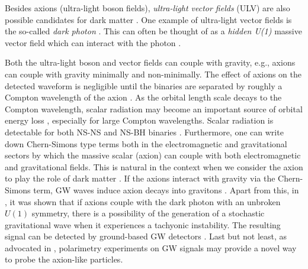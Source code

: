 Besides axions (ultra-light boson fields), \textit{ultra-light vector fields} (ULV) are also possible candidates for dark matter \cite{Cardoso:2018tly}.  One example of ultra-light vector fields is the so-called \textit{dark photon} \cite{Flambaum:2019cih}.  This can often be thought of as a \textit{hidden U(1)} massive vector field which can interact with the photon \cite{Cardoso:2018tly}.
\par
Both the ultra-light boson and vector fields can couple with gravity, e.g., axions can couple with gravity minimally and non-minimally.  The effect of axions on
the detected waveform is negligible until the binaries are separated by roughly a Compton wavelength of the axion \cite{Zhang:2019eid}. As the orbital length scale decays to the Compton wavelength, scalar radiation may become an important source
of orbital energy loss \cite{Huang:2018pbu}, especially for large Compton wavelengths.  Scalar radiation is detectable for both NS-NS and NS-BH binaries \cite{Dar:2018dra}.  Furthermore, one can write down Chern-Simons type terms both in the electromagnetic and gravitational sectors by which the massive scalar (axion) can couple with both electromagnetic and gravitational fields.  This is natural in the context when we consider the axion to play the role of dark matter \cite{Yoshida:2017cjl}.  If the axions interact with gravity via the Chern-Simons term, GW waves induce axion decays into gravitons \cite{Yoshida:2017cjl}.  Apart from this, in \cite{Machado:2018nqk, Machado:2019xuc}, it was shown that if axions couple with the dark photon with an unbroken $U(1)$ symmetry, there is a possibility of the generation of a stochastic gravitational wave when it experiences a tachyonic instability.  The resulting signal can be detected by ground-based GW detectors  \cite{Machado:2018nqk, Machado:2019xuc,10.21468/SciPostPhys.12.5.171}.  Last but not least, as advocated in \cite{ Ejlli:2022zah, Nagano:2021kwx}, polarimetry experiments on GW signals may provide a novel way to probe the axion-like particles.
\par 
